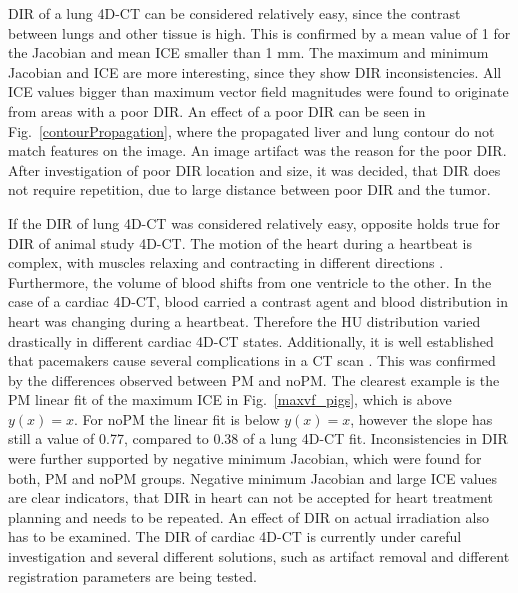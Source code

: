 DIR of a lung 4D-CT can be considered relatively easy, since the contrast between lungs and other tissue is high. 
This is confirmed by a mean value of 1 for the Jacobian and mean ICE smaller than 1 mm. The maximum and minimum Jacobian and ICE are more interesting, since they show 
DIR inconsistencies. All ICE values bigger than maximum vector field magnitudes were found to originate from areas with a poor DIR. An effect of a poor DIR can be seen in Fig.~\ref{contourPropagation},
where the propagated liver and lung contour do not match features on the image. An image artifact was the reason for the poor DIR. After investigation of poor DIR location and size, 
it was decided, that DIR does not require repetition, due to large distance between poor DIR and the tumor.

If the DIR of lung 4D-CT was considered relatively easy, opposite holds true for DIR of animal study 4D-CT. The motion of the heart during a heartbeat is complex, 
with muscles relaxing and contracting in different directions \cite{Seeley2007}. Furthermore,
the volume of blood shifts from one ventricle to the other. In the case of a cardiac 4D-CT, blood carried a contrast agent and blood distribution in heart was changing during a heartbeat. 
Therefore the HU distribution varied drastically in different cardiac 4D-CT states. Additionally, it is well established that pacemakers cause several complications in a CT scan \cite{Mak2012}. This was
confirmed by the differences observed between PM and noPM. The clearest example is the PM linear fit of the maximum ICE in Fig.~\ref{maxvf_pigs}, which is above $y(x) = x$. For noPM the linear
fit is below $y(x)=x$, however the slope has still a value of 0.77, compared to 0.38 of a lung 4D-CT fit. Inconsistencies in DIR were further supported by negative minimum Jacobian, which were found for both,
PM and noPM groups. Negative minimum Jacobian and large ICE values are clear indicators, that DIR in heart can not be 
accepted for heart treatment planning and needs to be repeated. An effect of DIR on actual irradiation also has to be examined.
The DIR of cardiac 4D-CT is currently under careful investigation
and several different solutions, such as artifact removal and different registration parameters are being tested.

